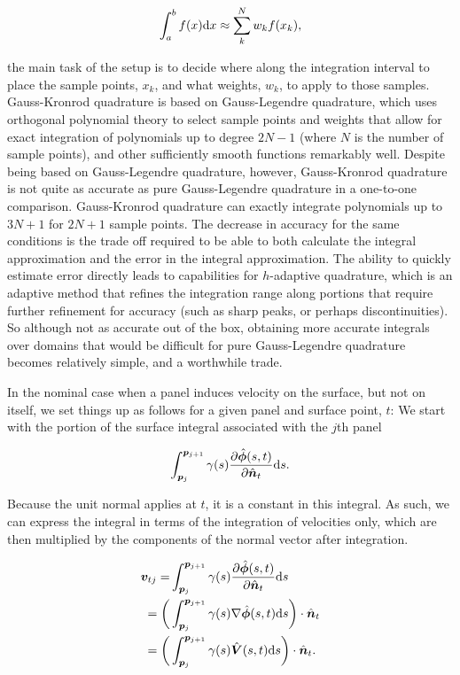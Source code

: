 \begin{equation}
    \int_a^b f(x) \mathrm{d} x \approx \sum_k^N w_k f(x_k),
\end{equation}

\where the main task of the setup is to decide where along the integration interval to place the sample points, \(x_k\), and what weights, \(w_k\), to apply to those samples.
%
Gauss-Kronrod quadrature is based on Gauss-Legendre quadrature, which uses orthogonal polynomial theory to select sample points and weights that allow for exact integration of polynomials up to degree \(2N-1\) (where \(N\) is the number of sample points), and other sufficiently smooth functions remarkably well.
%
Despite being based on Gauss-Legendre quadrature, however, Gauss-Kronrod quadrature is not quite as accurate as pure Gauss-Legendre quadrature in a one-to-one comparison.
%
Gauss-Kronrod quadrature can exactly integrate polynomials up to \(3N+1\) for \(2N+1\) sample points.
%
The decrease in accuracy for the same conditions is the trade off required to be able to both calculate the integral approximation and the error in the integral approximation.
%
The ability to quickly estimate error directly leads to capabilities for \(h\)-adaptive quadrature, which is an adaptive method that refines the integration range along portions that require further refinement for accuracy (such as sharp peaks, or perhaps discontinuities).
%
So although not as accurate out of the box, obtaining more accurate integrals over domains that would be difficult for pure Gauss-Legendre quadrature becomes relatively simple, and a worthwhile trade.

In the nominal case when a panel induces velocity on the surface, but not on itself, we set things up as follows for a given panel and surface point, \(t\):
%
We start with the portion of the surface integral associated with the \(j\)th panel

\begin{equation}
    \int_{\bm{p}_j}^{\bm{p}_{j+1}} \gamma(s) \frac{\partial \hat{\bm{\phi}}(s,t)}{\partial \hat{\bm{n}}_t} \mathrm{d} s.
\end{equation}

Because the unit normal applies at \(t\), it is a constant in this integral.
%
As such, we can express the integral in terms of the integration of velocities only, which are then multiplied by the components of the normal vector after integration.

\begin{equation}
    \begin{aligned}
        \bm{v}_{tj} =&\int_{\bm{p}_j}^{\bm{p}_{j+1}} \gamma(s) \frac{\partial \hat{\bm{\phi}}(s,t)}{\partial \hat{\bm{n}}_t} \mathrm{d} s \\
        =\bigg(&\int_{\bm{p}_j}^{\bm{p}_{j+1}} \gamma(s) \nabla \hat{\bm{\phi}}(s,t) \mathrm{d} s\bigg)\cdot \hat{\bm{n}}_t \\
        =\bigg(&\int_{\bm{p}_j}^{\bm{p}_{j+1}} \gamma(s) \hat{\bm{V}}(s,t) \mathrm{d} s\bigg)\cdot \hat{\bm{n}}_t.
    \end{aligned}
\end{equation}

